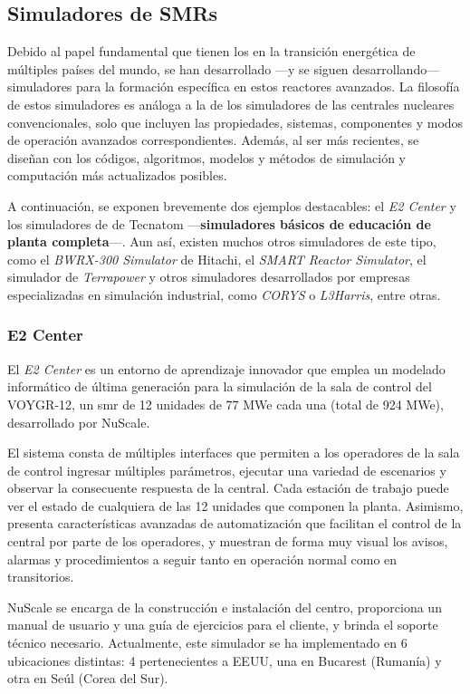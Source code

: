\subsection{Simuladores de SMRs}

Debido al papel fundamental que tienen los  en la transición energética de múltiples países del mundo, se han desarrollado ---y se siguen desarrollando--- simuladores para la formación específica en estos reactores avanzados. La filosofía de estos simuladores es análoga a la de los simuladores de las centrales nucleares convencionales, solo que incluyen las propiedades, sistemas, componentes y  modos de operación avanzados correspondientes. Además, al ser más recientes, se diseñan con los códigos, algoritmos, modelos y métodos de simulación y computación más actualizados posibles. 

A continuación, se exponen brevemente dos ejemplos destacables: el \textit{E2 Center} y los simuladores de  de Tecnatom ---\textbf{simuladores básicos de educación de planta completa}---. Aun así, existen muchos otros simuladores de este tipo, como el \textit{BWRX-300 Simulator} de Hitachi, el \textit{SMART Reactor Simulator}, el simulador de \textit{Terrapower} y otros simuladores desarrollados por empresas especializadas en simulación industrial, como \textit{CORYS} o \textit{L3Harris}, entre otras.

\subsubsection{E2 Center}

El \textit{E2 Center} es un entorno de aprendizaje innovador que emplea un modelado informático de última generación para la simulación de la sala de control del VOYGR-12, un \acrlong{smr} de 12 unidades de 77 MWe cada una (total de 924 MWe), desarrollado por NuScale.

El sistema consta de múltiples interfaces que permiten a los operadores de la sala de control ingresar múltiples parámetros, ejecutar una variedad de escenarios y observar la consecuente respuesta de la central. Cada estación de trabajo puede ver el estado de cualquiera de las 12 unidades que componen la planta. Asimismo, presenta características avanzadas de automatización que facilitan el control de la central por parte de los operadores, y muestran de forma muy visual los avisos, alarmas y procedimientos a seguir tanto en operación normal como en transitorios.

NuScale se encarga de la construcción e instalación del centro, proporciona un manual de usuario y una guía de ejercicios para el cliente, y brinda el soporte técnico necesario. Actualmente, este simulador se ha implementado en 6 ubicaciones distintas: 4 pertenecientes a EEUU, una en Bucarest (Rumanía) y otra en Seúl (Corea del Sur).

